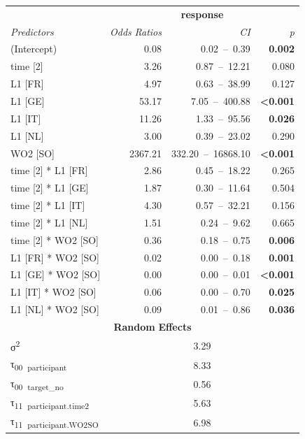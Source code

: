 \begin{table}
    \begin{tabularx}{\textwidth}{Xrrr}
    \lsptoprule
    \textbf{~} & \multicolumn{3}{c}{ \textbf{response}}\\
    \textit{Predictors} & \textit{Odds} \textit{Ratios} & \textit{CI} & \textit{p}\\
    \midrule
    (Intercept) & 0.08 & 0.02~–~0.39 & \textbf{0.002}\\
    time [2] & 3.26 & 0.87~–~12.21 & 0.080\\
    L1 [FR] & 4.97 & 0.63~–~38.99 & 0.127\\
    L1 [GE] & 53.17 & 7.05~–~400.88 & \textbf{<0.001}\\
    L1 [IT] & 11.26 & 1.33~–~95.56 & \textbf{0.026}\\
    L1 [NL] & 3.00 & 0.39~–~23.02 & 0.290\\
    WO2 [SO] & 2367.21 & 332.20~–~16868.10 & \textbf{<0.001}\\
    time [2] * L1 [FR] & 2.86 & 0.45~–~18.22 & 0.265\\
    time [2] * L1 [GE] & 1.87 & 0.30~–~11.64 & 0.504\\
    time [2] * L1 [IT] & 4.30 & 0.57~–~32.21 & 0.156\\
    time [2] * L1 [NL] & 1.51 & 0.24~–~9.62 & 0.665\\
    time [2] * WO2 [SO] & 0.36 & 0.18~–~0.75 & \textbf{0.006}\\
    L1 [FR] * WO2 [SO] & 0.02 & 0.00~–~0.18 & \textbf{0.001}\\
    L1 [GE] * WO2 [SO] & 0.00 & 0.00~–~0.01 & \textbf{<0.001}\\
    L1 [IT] * WO2 [SO] & 0.06 & 0.00~–~0.70 & \textbf{0.025}\\
    L1 [NL] * WO2 [SO] & 0.09 & 0.01~–~0.86 & \textbf{0.036}\\
    \multicolumn{4}{c}{\textbf{Random} \textbf{Effects}}\\
    σ\textsuperscript{2} & \multicolumn{3}{c}{3.29}\\
    τ\textsubscript{00}~\textsubscript{participant} & \multicolumn{3}{c}{8.33}\\
    τ\textsubscript{00}~\textsubscript{target\_no} & \multicolumn{3}{c}{0.56}\\
    τ\textsubscript{11}~\textsubscript{participant.time2} & \multicolumn{3}{c}{5.63}\\
    τ\textsubscript{11}~\textsubscript{participant.WO2SO} & \multicolumn{3}{c}{6.98}\\

\end{tabularx}
\end{table}

